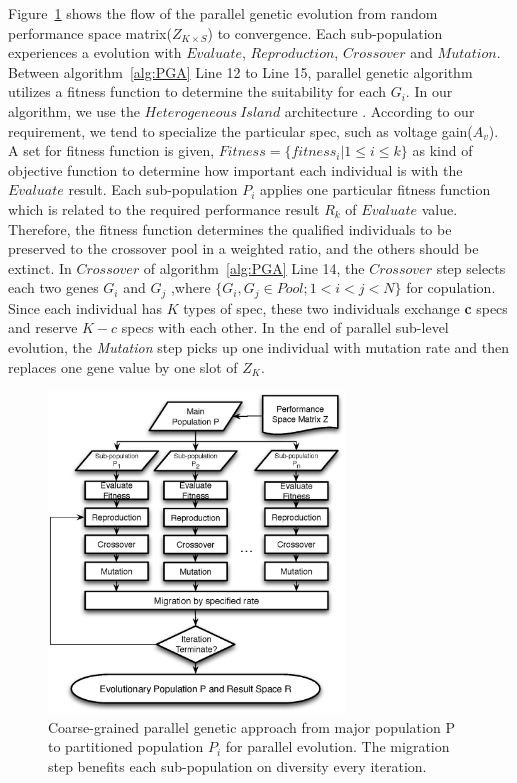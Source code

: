       Figure~\ref{fig:PGAFlow} shows the flow of the parallel genetic evolution from random performance space matrix($Z_{K\times S}$) to convergence. Each sub-population experiences a evolution with $Evaluate$, $Reproduction$, $Crossover$ and $Mutation$. Between algorithm~\ref{alg:PGA} Line 12 to Line 15, parallel genetic algorithm utilizes a fitness function to determine the suitability for each $G_i$. In our algorithm, we use the $Heterogeneous\ Island$ architecture \cite{SurveyCGPGA1994}. According to our requirement, we tend to specialize the particular spec, such as voltage gain($A_v$). A set for fitness function is given, $Fitness = \{{fitness}_i| 1 \leq i \leq k\}$ as kind of objective function to determine how important each individual is with the $Evaluate$ result. Each sub-population $P_i$ applies one particular fitness function which is related to the required performance result $R_k$ of $Evaluate$ value. Therefore, the fitness function determines the qualified individuals to be preserved to the crossover pool in a weighted ratio, and the others should be extinct. In $Crossover$ of algorithm~\ref{alg:PGA} Line 14, the $Crossover$ step selects each two genes $G_i$ and $G_j$ ,where $\{G_i,G_j \in Pool; 1 < i<j<N\} $ for copulation. Since each individual has $K$ types of spec, these two individuals exchange {\bf c} specs and reserve {\bf $K-c$} specs with each other. In the end of parallel sub-level evolution, the {\it Mutation} step picks up one individual with mutation rate and then replaces one gene value by one slot of $Z_K$. 
    
      \begin{figure}[t]
        \centering
        \includegraphics[width=0.7\textwidth]{Fig/Chapter2/PAGEflowchart.eps}
        \caption{Coarse-grained parallel genetic approach from major population P to partitioned population $P_i$ for parallel evolution. The migration step benefits each sub-population on diversity every iteration.} 
        \label{fig:PGAFlow}
      \end{figure}

